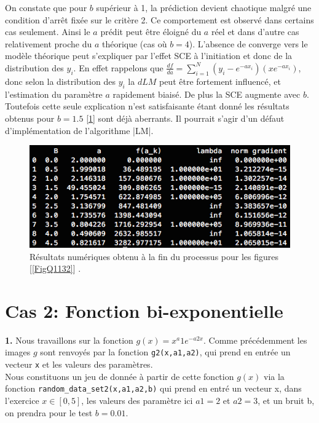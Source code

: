 \documentclass[12pt]{article}
\begin{document}
On constate que pour $b$ supérieur à 1, la prédiction devient chaotique malgré une condition d'arrêt fixée sur le critère 2. Ce comportement est observé dans certains cas seulement. Ainsi le $a$ prédit peut être éloigné du $a$ réel et dans d'autre cas relativement proche du $a$ théorique (cas où $b = 4$). L'absence de converge vers le modèle théorique peut s'expliquer par  l'effet SCE à l'initiation et donc de  la distribution des $y_i$. En effet rappelons que $\frac{d f}{d a} = \sum_{i=1}^N (y_i - e^{-ax_i})(x e^{-ax_i})$, donc selon la distribution des $y_i$ la $dLM$ peut être fortement influencé, et l'estimation du paramètre $a$ rapidement biaisé. De plus la SCE augmente avec $b$. Toutefois cette seule explication n'est satisfaisante étant donné les résultats obtenus pour $b=1.5$ [\ref{FigQcap}] sont déjà aberrants. Il pourrait s'agir d'un défaut d'implémentation de l'algorithme \vreb|LM|.


  \begin{figure}[H]
\centering
\includegraphics[width=1\textwidth]{Q113CAP.png}
\caption{Résultats numériques obtenu à la fin du processus pour les figures [\ref{FigQ1132}] .}
\label{FigQcap}
\end{figure}
 
 \section*{\color{brick} Cas 2:  Fonction bi-exponentielle}
 \textbf{\color{brick}1.} Nous travaillons sur la fonction $g(x) = x^a1 e^{-a2x}$. Comme précédemment les images $g$ sont renvoyés par la fonction \verb|g2(x,a1,a2)|, qui prend en entrée un vecteur \verb|x| et les valeurs des paramètres.\\
 Nous constituons un jeu de donnée à partir de cette fonction  $g(x)$ via la fonction \verb|random_data_set2(x,a1,a2,b)|  qui prend en entré  un vecteur x, dans l'exercice $x \in [0,5]$, les valeurs des paramètre ici $a1 = 2$ et $a2 =3$, et un bruit b, on prendra pour le test $b=0.01$.
 
\end{document}
